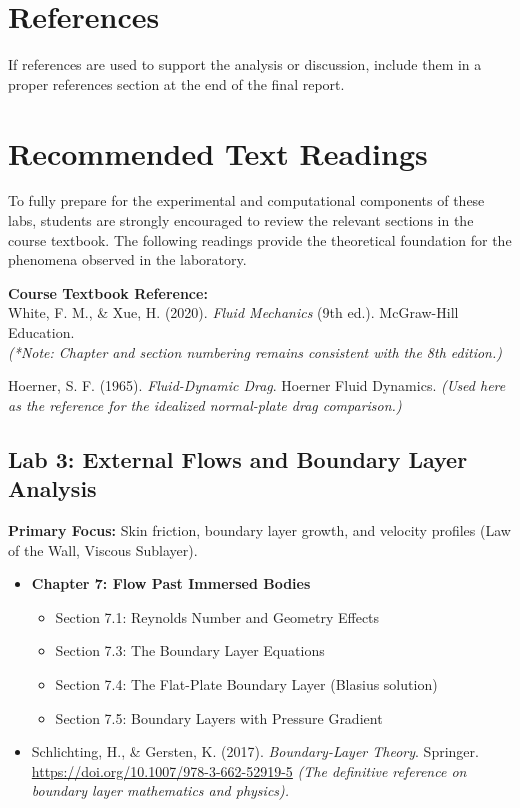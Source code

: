 \documentclass[12pt,letterpaper]{article}
\begin{document}
\section*{References}
If references are used to support the analysis or discussion, include them in a proper references section at the end of the final report.

\section{Recommended Text Readings}

To fully prepare for the experimental and computational components of these labs, students are strongly encouraged to review the relevant sections in the course textbook. The following readings provide the theoretical foundation for the phenomena observed in the laboratory.

\vspace{0.3cm}
\noindent\textbf{Course Textbook Reference:} \\
White, F. M., \& Xue, H. (2020). \textit{Fluid Mechanics} (9th ed.). McGraw-Hill Education. \\
\textit{(*Note: Chapter and section numbering remains consistent with the 8th edition.)}

\noindent Hoerner, S. F. (1965). \textit{Fluid-Dynamic Drag}. Hoerner Fluid Dynamics. \textit{(Used here as the reference for the idealized normal-plate drag comparison.)}
\vspace{0.3cm}


\subsection*{Lab 3: External Flows and Boundary Layer Analysis}
\textbf{Primary Focus:} Skin friction, boundary layer growth, and velocity profiles (Law of the Wall, Viscous Sublayer).
\begin{itemize}
    \item \textbf{Chapter 7: Flow Past Immersed Bodies}
    \begin{itemize}
        \item Section 7.1: Reynolds Number and Geometry Effects
        \item Section 7.3: The Boundary Layer Equations
        \item Section 7.4: The Flat-Plate Boundary Layer (Blasius solution)
        \item Section 7.5: Boundary Layers with Pressure Gradient
    \end{itemize}

\end{itemize}
\begin{itemize}
        \item Schlichting, H., \& Gersten, K. (2017). \textit{Boundary-Layer Theory}. Springer. \url{https://doi.org/10.1007/978-3-662-52919-5} \textit{(The definitive reference on boundary layer mathematics and physics).}

    \end{itemize}
\end{document}
